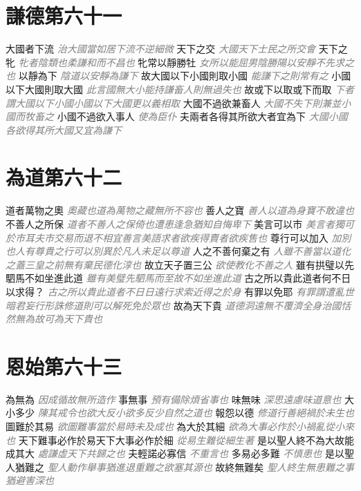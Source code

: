 \documentclass[a4paper,zihao=-4,oneside,landscape,UTF8]{ctexart}
\newcommand{\zhushi}[1]{\scriptsize{\textit{\textcolor{gray}{#1}}}\normalsize}
\begin{document}
\section{謙德第六十一}

大國者下流
\zhushi{治大國當如居下流不逆細微}
天下之交
\zhushi{大國天下士民之所交會}
天下之牝
\zhushi{牝者陰類也柔謙和而不昌也}
牝常以靜勝牡
\zhushi{女所以能屈男陰勝陽以安靜不先求之也}
以靜為下
\zhushi{陰道以安靜為謙下}
故大國以下小國則取小國
\zhushi{能謙下之則常有之}
小國以下大國則取大國
\zhushi{此言國無大小能持謙畜人則無過失也}
故或下以取或下而取
\zhushi{下者謂大國以下小國小國以下大國更以義相取}
大國不過欲兼畜人
\zhushi{大國不失下則兼並小國而牧畜之}
小國不過欲入事人
\zhushi{使為臣仆}
夫兩者各得其所欲大者宜為下
\zhushi{大國小國各欲得其所大國又宜為謙下}


\section{為道第六十二}

道者萬物之奧
\zhushi{奧藏也道為萬物之藏無所不容也}
善人之寶
\zhushi{善人以道為身寶不敢違也}
不善人之所保
\zhushi{道者不善人之保倚也遭患逢急猶知自悔卑下}
美言可以市
\zhushi{美言者獨可於市耳夫市交易而退不相宜善言美語求者欲疾得賣者欲疾售也}
尊行可以加入
\zhushi{加別也人有尊貴之行可以別異於凡人未足以尊道}
人之不善何棄之有
\zhushi{人雖不善當以道化之蓋三皇之前無有棄民德化淳也}
故立天子置三公
\zhushi{欲使教化不善之人}
雖有拱璧以先駟馬不如坐進此道
\zhushi{雖有美璧先駟馬而至故不如坐進此道}
古之所以貴此道者何不日以求得？
\zhushi{古之所以貴此道者不日日遠行求索近得之於身}
有罪以免耶
\zhushi{有罪謂遭亂世暗君妄行形誅修道則可以解死免於眾也}
故為天下貴
\zhushi{道德洞遠無不覆濟全身治國恬然無為故可為天下貴也}


\section{恩始第六十三}

為無為
\zhushi{因成循故無所造作}
事無事
\zhushi{預有備除煩省事也}
味無味
\zhushi{深思遠慮味道意也}
大小多少
\zhushi{陳其戒令也欲大反小欲多反少自然之道也}
報怨以德
\zhushi{修道行善絕禍於未生也}
圖難於其易
\zhushi{欲圖難事當於易時未及成也}
為大於其細
\zhushi{欲為大事必作於小禍亂從小來也}
天下難事必作於易天下大事必作於細
\zhushi{從易生難從細生著}
是以聖人終不為大故能成其大
\zhushi{處謙虛天下共歸之也}
夫輕諾必寡信
\zhushi{不重言也}
多易必多難
\zhushi{不慎患也}
是以聖人猶難之
\zhushi{聖人動作舉事猶進退重難之欲塞其源也}
故終無難矣
\zhushi{聖人終生無患難之事猶避害深也}
\end{document}
